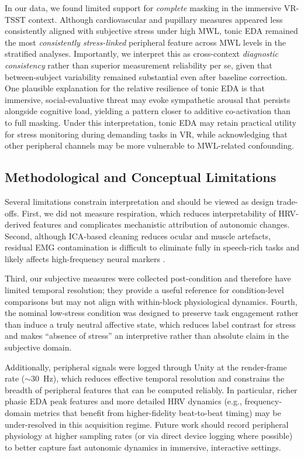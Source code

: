 \documentclass[lettersize,journal]{IEEEtran}
\begin{document}
In our data, we found limited support for \emph{complete} masking in the immersive VR-TSST context. Although cardiovascular and pupillary measures appeared less consistently aligned with subjective stress under high MWL, tonic EDA remained the most \emph{consistently stress-linked} peripheral feature across MWL levels in the stratified analyses. Importantly, we interpret this as cross-context \emph{diagnostic consistency} rather than superior measurement reliability per se, given that between-subject variability remained substantial even after baseline correction. One plausible explanation for the relative resilience of tonic EDA is that immersive, social-evaluative threat may evoke sympathetic arousal that persists alongside cognitive load, yielding a pattern closer to additive co-activation than to full masking. Under this interpretation, tonic EDA may retain practical utility for stress monitoring during demanding tasks in VR, while acknowledging that other peripheral channels may be more vulnerable to MWL-related confounding.

\subsection{Methodological and Conceptual Limitations}
Several limitations constrain interpretation and should be viewed as design trade-offs. First, we did not measure respiration, which reduces interpretability of HRV-derived features and complicates mechanistic attribution of autonomic changes. Second, although ICA-based cleaning reduces ocular and muscle artefacts, residual EMG contamination is difficult to eliminate fully in speech-rich tasks and likely affects high-frequency neural markers \cite{goncharovaEMGContaminationEEG2003}.

Third, our subjective measures were collected post-condition and therefore have limited temporal resolution; they provide a useful reference for condition-level comparisons but may not align with within-block physiological dynamics. Fourth, the nominal low-stress condition was designed to preserve task engagement rather than induce a truly neutral affective state, which reduces label contrast for stress and makes ``absence of stress'' an interpretive rather than absolute claim in the subjective domain.

Additionally, peripheral signals were logged through Unity at the render-frame rate (\(\sim\)30~Hz), which reduces effective temporal resolution and constrains the breadth of peripheral features that can be computed reliably. In particular, richer phasic EDA peak features and more detailed HRV dynamics (e.g., frequency-domain metrics that benefit from higher-fidelity beat-to-beat timing) may be under-resolved in this acquisition regime. Future work should record peripheral physiology at higher sampling rates (or via direct device logging where possible) to better capture fast autonomic dynamics in immersive, interactive settings.
\end{document}
